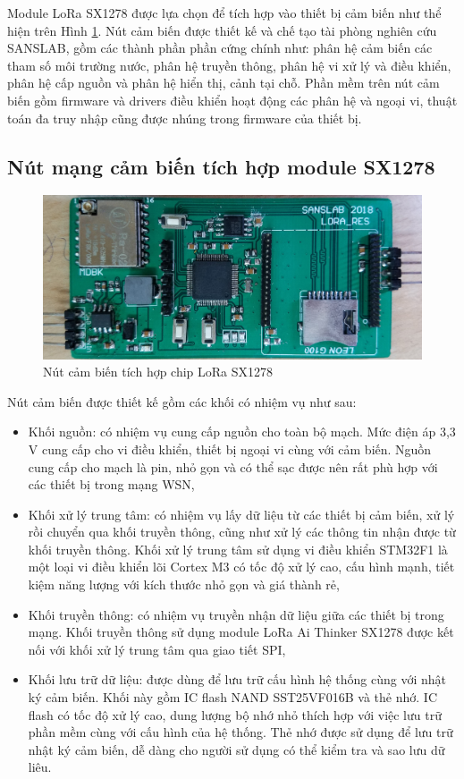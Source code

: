 \par Module LoRa SX1278 được lựa chọn để tích hợp vào thiết bị cảm biến như thể hiện trên Hình \ref{moduleSX1278}{}. Nút cảm biến được thiết kế và chế tạo tài phòng nghiên cứu SANSLAB, gồm các thành phần phần cứng chính như: phân hệ cảm biến các tham số môi trường nước, phân hệ truyền thông, phân hệ vi xử lý và điều khiển, phân hệ cấp nguồn và phân hệ hiển thị, cảnh tại chỗ. Phần mềm trên nút cảm biến gồm firmware và drivers điều khiển hoạt động các phân hệ và ngoại vi, thuật toán đa truy nhập cũng được nhúng trong firmware của thiết bị.
\subsection{Nút mạng cảm biến tích hợp module SX1278}
\begin{figure}[h]
	\begin{center}
		\includegraphics[scale=0.38]{image/hinh3_1}
	\end{center}
	\caption{Nút cảm biến tích hợp chip LoRa SX1278}
	\label{moduleSX1278}
\end{figure}
\noindent Nút cảm biến được thiết kế gồm các khối có nhiệm vụ như sau:
\begin{itemize}
\item	Khối nguồn: có nhiệm vụ cung cấp nguồn cho toàn bộ mạch. Mức điện áp 3,3 V cung cấp cho vi điều khiển, thiết bị ngoại vi cùng với cảm biến. Nguồn cung cấp cho mạch là pin, nhỏ gọn và có thể sạc được nên rất phù hợp với các thiết bị trong mạng WSN,
\item	Khối xử lý trung tâm: có nhiệm vụ lấy dữ liệu từ các thiết bị cảm biến, xử lý rồi chuyển qua khối truyền thông, cũng như xử lý các thông tin nhận được từ khối truyền thông. Khối xử lý trung tâm sử dụng vi điều khiển STM32F1 là một loại vi điều khiển lõi Cortex M3 có tốc độ xử lý cao, cấu hình mạnh, tiết kiệm năng lượng với kích thước nhỏ gọn và giá thành rẻ,
\item	Khối truyền thông: có nhiệm vụ truyền nhận dữ liệu giữa các thiết bị trong mạng. Khối truyền thông sử dụng module LoRa Ai Thinker SX1278 được kết nối với khối xử lý trung tâm qua giao tiết SPI,
\item	Khối lưu trữ dữ liệu: được dùng để lưu trữ cấu hình hệ thống cùng với nhật ký cảm biến. Khối này gồm IC flash NAND SST25VF016B và thẻ nhớ. IC flash có tốc độ xử lý cao, dung lượng bộ nhớ nhỏ thích hợp với việc lưu trữ phần mềm cùng với cấu hình của hệ thống. Thẻ nhớ được sử dụng để lưu trữ nhật ký cảm biến, dễ dàng cho người sử dụng có thể kiểm tra và sao lưu dữ liêu.
\end{itemize}
